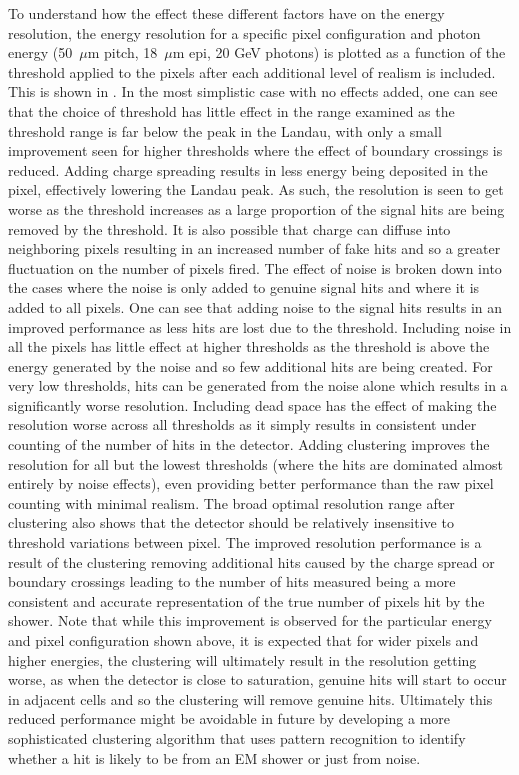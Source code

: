 To understand how the effect these different factors have on the energy resolution, the energy resolution for a specific pixel configuration and photon energy (50~$\mu$m pitch, 18~$\mu$m epi, 20 GeV photons) is plotted as a function of the threshold applied to the pixels after each additional level of realism is included. This is shown in . In the most simplistic case with no effects added, one can see that the choice of threshold has little effect in the range examined as the threshold range is far below the peak in the Landau, with only a small improvement seen for higher thresholds where the effect of boundary crossings is reduced. Adding charge spreading results in less energy being deposited in the pixel, effectively lowering the Landau peak. As such, the resolution is seen to get worse as the threshold increases as a large proportion of the signal hits are being removed by the threshold. It is also possible that charge can diffuse into neighboring pixels resulting in an increased number of fake hits and so a greater fluctuation on the number of pixels fired. The effect of noise is broken down into the cases where the noise is only added to genuine signal hits and where it is added to all pixels. One can see that adding noise to the signal hits results in an improved performance as less hits are lost due to the threshold. Including noise in all the pixels has little effect at higher thresholds as the threshold is above the energy generated by the noise and so few additional hits are being created. For very low thresholds, hits can be generated from the noise alone which results in a significantly worse resolution. Including dead space has the effect of making the resolution worse across all thresholds as it simply results in consistent under counting of the number of hits in the detector. Adding clustering improves the resolution for all but the lowest thresholds (where the hits are dominated almost entirely by noise effects), even providing better performance than the raw pixel counting with minimal realism. The broad optimal resolution range after clustering also shows that the detector should be relatively insensitive to threshold variations between pixel. The improved resolution performance is a result of the clustering removing additional hits caused by the charge spread or boundary crossings leading to the number of hits measured being a more consistent and accurate representation of the true number of pixels hit by the shower. Note that while this improvement is observed for the particular energy and pixel configuration shown above, it is expected that for wider pixels and higher energies, the clustering will ultimately result in the resolution getting worse, as when the detector is close to saturation, genuine hits will start to occur in adjacent cells and so the clustering will remove genuine hits. Ultimately this reduced performance might be avoidable in future by developing a more sophisticated clustering algorithm that uses pattern recognition to identify whether a hit is likely to be from an EM shower or just from noise.


